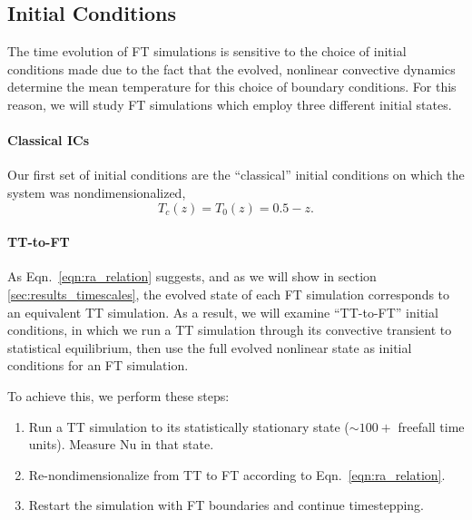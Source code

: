 \documentclass[aps, pre, onecolumn, nofootinbib, notitlepage, groupedaddress, amsfonts, amssymb, amsmath, longbibliography, superscriptaddress]{revtex4-1}
\newcommand{\ea}[1]{{\color{red} #1}}
\begin{document}
\ea{
\subsection{Initial Conditions}
The time evolution of FT simulations is sensitive to the choice of initial conditions made due to the fact that the evolved, nonlinear convective dynamics determine the mean temperature for this choice of boundary conditions.
For this reason, we will study FT simulations which employ three different initial states.

\paragraph{Classical ICs} 
Our first set of initial conditions are the ``classical'' initial conditions on which the system was nondimensionalized,
\begin{equation}
T_c(z) = T_0(z) = 0.5 - z.
\end{equation}

\paragraph{TT-to-FT}
As Eqn.~\ref{eqn:ra_relation} suggests, and as we will show in section \ref{sec:results_timescales}, the evolved state of each FT simulation corresponds to an equivalent TT simulation.
As a result, we will examine ``TT-to-FT'' initial conditions, in which we run a TT simulation through its convective transient to statistical equilibrium, then use the full evolved nonlinear state as initial conditions for an FT simulation.
}
To achieve this, we perform these steps:
\begin{enumerate}
\item Run a TT simulation to its statistically stationary state ($\sim100+$ freefall time units). 
Measure $\text{Nu}$ in that state.
\item Re-nondimensionalize from TT to FT according to Eqn.~\ref{eqn:ra_relation}.
\item Restart the simulation with FT boundaries and continue timestepping.
\end{enumerate}
\end{document}
